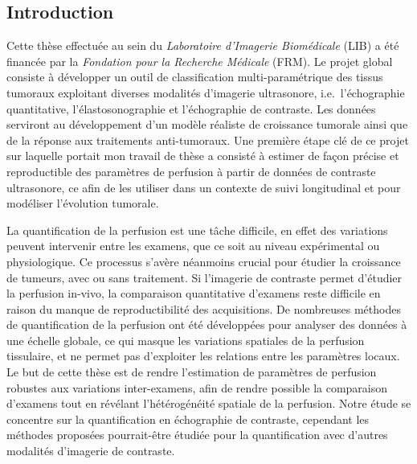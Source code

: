 \begin{otherlanguage}{francais}
\subsection*{Introduction}
Cette th\`ese effectu\'ee au sein du {\em Laboratoire d'Imagerie Biom\'edicale} (LIB) a \'et\'e financ\'ee par la {\em Fondation pour la Recherche M\'edicale} (FRM).
Le projet global consiste \`a d\'evelopper un outil de classification multi-param\'etrique des tissus tumoraux exploitant diverses modalit\'es d'imagerie ultrasonore, i.e.~l'\'echographie quantitative, l'\'elastosonographie et l'\'echographie de contraste.
Les donn\'ees serviront au d\'eveloppement d'un mod\`ele r\'ealiste de croissance tumorale ainsi que de la r\'eponse aux traitements anti-tumoraux.
Une premi\`ere \'etape cl\'e de ce projet sur laquelle portait mon travail de th\`ese a consist\'e \`a estimer de fa\c{c}on pr\'ecise et reproductible des param\`etres de perfusion \`a partir de donn\'ees de contraste ultrasonore, ce afin de les utiliser dans un contexte de suivi longitudinal et pour mod\'eliser l'\'evolution tumorale.

La quantification de la perfusion est une t\^ache difficile, en effet des variations peuvent intervenir entre les examens, que ce soit au niveau exp\'erimental ou physiologique. 
Ce processus s'av\`ere n\'eanmoins crucial pour \'etudier la croissance de tumeurs, avec ou sans traitement.
Si l'imagerie de contraste permet d'\'etudier la perfusion in-vivo, la comparaison quantitative d'examens reste difficile en raison du manque de reproductibilit\'e des acquisitions.
De nombreuses m\'ethodes de quantification de la perfusion ont \'et\'e d\'evelopp\'ees pour analyser des donn\'ees \`a une \'echelle globale, ce qui masque les variations spatiales de la perfusion tissulaire, et ne permet pas d'exploiter les relations entre les param\`etres locaux.
Le but de cette th\`ese est de rendre l'estimation de param\`etres de perfusion robustes aux variations inter-examens, afin de rendre possible la comparaison d'examens tout en r\'ev\'elant l'h\'et\'erog\'en\'eit\'e spatiale de la perfusion.
Notre \'etude se concentre sur la quantification en \'echographie de contraste, cependant les m\'ethodes propos\'ees pourrait-\^etre \'etudi\'ee pour la quantification avec d'autres modalit\'es d'imagerie de contraste.


\end{otherlanguage}
